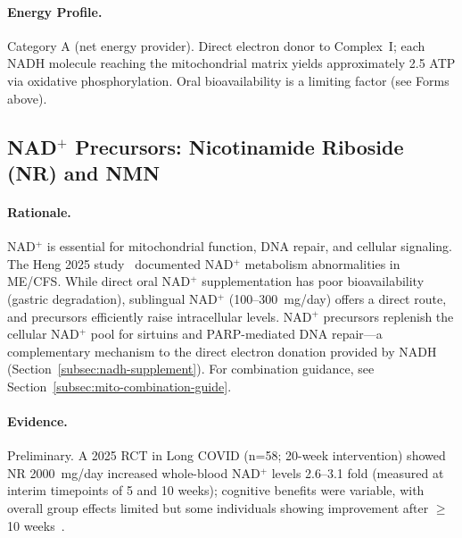 \paragraph{Energy Profile.}
Category A (net energy provider). Direct electron donor to Complex~I; each NADH molecule reaching the mitochondrial matrix yields approximately 2.5 ATP via oxidative phosphorylation. Oral bioavailability is a limiting factor (see Forms above).

\subsection{NAD$^+$ Precursors: Nicotinamide Riboside (NR) and NMN}

\paragraph{Rationale.} NAD$^+$ is essential for mitochondrial function, DNA repair, and cellular signaling. The Heng 2025 study~\cite{heng2025mecfs} documented NAD$^+$ metabolism abnormalities in ME/CFS. While direct oral NAD$^+$ supplementation has poor bioavailability (gastric degradation), sublingual NAD$^+$ (100--300~mg/day) offers a direct route, and precursors efficiently raise intracellular levels. NAD$^+$ precursors replenish the cellular NAD$^+$ pool for sirtuins and PARP-mediated DNA repair---a complementary mechanism to the direct electron donation provided by NADH (Section~\ref{subsec:nadh-supplement}). For combination guidance, see Section~\ref{subsec:mito-combination-guide}.

\paragraph{Evidence.} Preliminary. A 2025 RCT in Long COVID (n=58; 20-week intervention) showed NR 2000~mg/day increased whole-blood NAD$^+$ levels 2.6--3.1 fold (measured at interim timepoints of 5 and 10 weeks); cognitive benefits were variable, with overall group effects limited but some individuals showing improvement after $\geq$10 weeks~\cite{Wu2025NRLongCOVID}.

